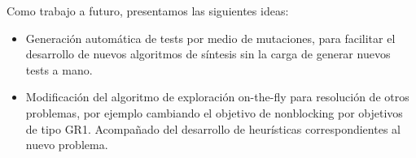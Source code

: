 Como trabajo a futuro, presentamos las siguientes ideas: 
\begin{itemize}
	\item Generación automática de tests por medio de mutaciones, para facilitar el desarrollo de nuevos algoritmos de síntesis sin la carga de generar nuevos tests a mano. 
	
	\item Modificación del algoritmo de exploración on-the-fly para resolución de otros problemas, por ejemplo cambiando el objetivo de nonblocking por objetivos de tipo GR1. Acompañado del desarrollo de heurísticas correspondientes al nuevo problema.
\end{itemize}


